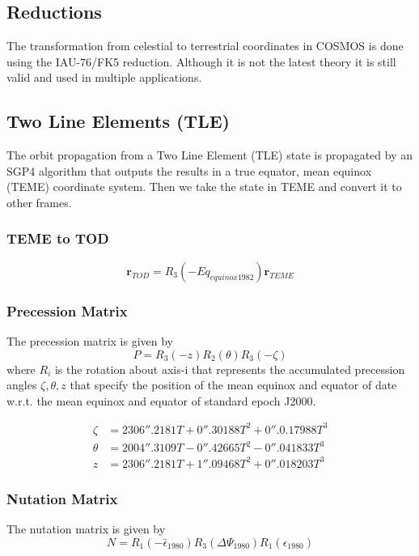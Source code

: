 \documentclass[12pt,letterpaper]{paper}
\begin{document}
\subsection{Reductions}
The transformation from celestial to terrestrial coordinates in COSMOS is done using the IAU-76/FK5 reduction. Although it is not the latest theory it is still valid and used in multiple applications.
\subsection{Two Line Elements (TLE)}

The orbit propagation from a Two Line Element (TLE) state is propagated by an SGP4 algorithm that outputs the results in a true equator, mean equinox (TEME) coordinate system. Then we take the state in TEME and convert it to other frames.

\subsubsection{TEME to TOD}
\begin{equation}
\mathbf{r}_{TOD} = R_3(-Eq_{equinox1982}) \mathbf{r}_{TEME}
\end{equation}

\subsubsection{Precession Matrix}
The precession matrix is given by
\begin{equation}
P = R_3(-z)R_2(\theta)R_3(-\zeta)
\end{equation}
where $R_i$ is the rotation about axis-i that represents the accumulated precession angles $\zeta, \theta, z$ that specify the position of the mean equinox and equator of date w.r.t. the mean equinox and equator of standard epoch J2000.

\begin{align}
\zeta &= 2306''.2181T + 0''.30188T^2 + 0''.0.17988T^3\\
\theta &= 2004''.3109T - 0''.42665T^2 - 0''.041833T^3\\
z &= 2306''.2181T + 1''.09468T^2 + 0''.018203T^3
\end{align}

\subsubsection{Nutation Matrix}
The nutation matrix is given by
\begin{equation}
N = R_1(- \bar{\epsilon}_{1980})R_3(\Delta\Psi_{1980})R_1(\epsilon_{1980})
\end{equation}
\end{document}
